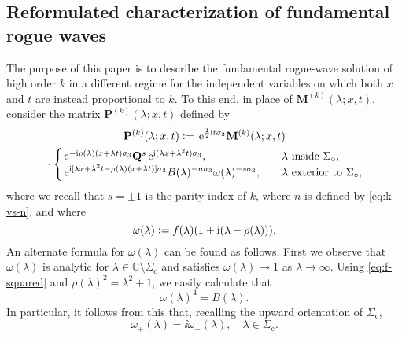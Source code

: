 \subsection{Reformulated characterization of fundamental rogue waves}
The purpose of this paper is to describe the fundamental rogue-wave solution of high order $k$ in a different regime for the independent variables on which both $x$ and $t$ are instead proportional to $k$.  To this end, in
place of $\mathbf{M}^{(k)}(\lambda;x,t)$, consider the matrix $\mathbf{P}^{(k)}(\lambda;x,t)$ defined by
\begin{multline}
\mathbf{P}^{(k)}(\lambda;x,t)\vcentcolon=
\,\mathrm{e}^{\frac{1}{2}\mathrm{i} t\sigma_3}\mathbf{M}^{(k)}(\lambda;x,t)\\{}\cdot
\begin{cases}
\,\mathrm{e}^{-\mathrm{i}\rho(\lambda)(x+\lambda t)\sigma_3}\mathbf{Q}^{s}\,\mathrm{e}^{\mathrm{i}(\lambda x+\lambda^2 t)\sigma_3},&\quad
\text{$\lambda$ inside $\Sigma_\circ$},\\ \displaystyle 
\,\mathrm{e}^{\mathrm{i}[\lambda x+\lambda^2t-\rho(\lambda)(x+\lambda t)]\sigma_3}
B(\lambda)^{-n\sigma_3}
\omega(\lambda)^{-s\sigma_3},&\quad 
\text{$\lambda$ exterior to $\Sigma_\circ$},
\end{cases}
\label{eq:M-P-bulk}
\end{multline}
where we recall that $s=\pm 1$ is the parity index of $k$, where $n$ is defined by \eqref{eq:k-vs-n}, 
and where
\begin{equation}
\omega(\lambda)\vcentcolon= f(\lambda)(1+\mathrm{i} (\lambda-\rho(\lambda))).
\label{eq:omega-def}
\end{equation}
An alternate formula for $\omega(\lambda)$ %
can be found as follows.  First we observe that $\omega(\lambda)$ is analytic for $\lambda\in\mathbb{C}\setminus\Sigma_\mathrm{c}$ and satisfies $\omega(\lambda)\to 1$ as $\lambda\to\infty$.  Using \eqref{eq:f-squared} and $\rho(\lambda)^2=\lambda^2+1$, we easily calculate that
\begin{equation}
\omega(\lambda)^4 = B(\lambda).
\label{eq:omega-fourth-power}
\end{equation}
In particular, it follows from this that, recalling the upward orientation of $\Sigma_\mathrm{c}$,
\begin{equation}
\omega_+(\lambda)=\ii\omega_-(\lambda),\quad\lambda\in\Sigma_\mathrm{c}.
\label{eq:omega-jump}
\end{equation}

